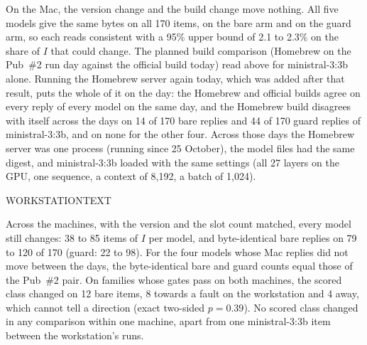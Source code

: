 On the Mac, the version change and the build change move nothing. All five models give the same bytes on all 170 items, on the bare
arm and on the guard arm, so each reads consistent with a 95\% upper bound of 2.1 to 2.3\% on the share of $I$ that could change. The
planned build comparison (Homebrew on the Pub~\#2 run day against the official build today) read above for ministral-3:3b alone. Running
the Homebrew server again today, which was added after that result, puts the whole of it on the day: the Homebrew and official builds
agree on every reply of every model on the same day, and the Homebrew build disagrees with itself across the days on 14 of 170 bare
replies and 44 of 170 guard replies of ministral-3:3b, and on none for the other four. Across those days the Homebrew server was one
process (running since 25 October), the model files had the same digest, and ministral-3:3b loaded with the same settings (all 27 layers
on the GPU, one sequence, a context of 8,192, a batch of 1,024).

WORKSTATIONTEXT

Across the machines, with the version and the slot count matched, every model still changes: 38 to 85 items of $I$ per model, and
byte-identical bare replies on 79 to 120 of 170 (guard: 22 to 98). For the four models whose Mac replies did not move between the days,
the byte-identical bare and guard counts equal those of the Pub~\#2 pair. On families whose gates pass on both machines, the scored class changed on 12 bare items, 8
towards a fault on the workstation and 4 away, which cannot tell a direction (exact two-sided $p=0.39$). No scored class changed in any
comparison within one machine, apart from one ministral-3:3b item between the workstation's runs.
